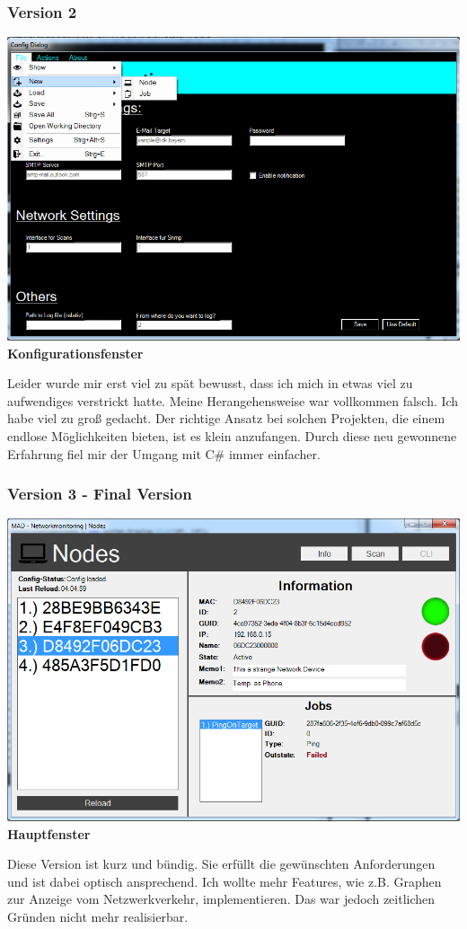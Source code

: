\documentclass[12pt,a4paper]{report}
\begin{document}
\begin{onehalfspace}
\subsubsection{Version 2}
\begin{center}
\includegraphics[scale=0.65]{../docs/lyaton/graphics/GUI_v2_config.png}\\
\textbf{Konfigurationsfenster}
\end{center}
Leider wurde mir erst viel zu spät bewusst, dass ich mich in etwas viel zu aufwendiges verstrickt hatte. Meine Herangehensweise war vollkommen falsch. Ich habe viel zu groß gedacht. Der richtige Ansatz bei solchen Projekten, die einem endlose Möglichkeiten bieten, ist es klein anzufangen. 
Durch diese neu gewonnene Erfahrung fiel mir der Umgang mit C\# immer einfacher.
\subsubsection{Version 3 - Final Version}
\begin{center}
\includegraphics[scale=0.65]{../docs/lyaton/graphics/GUI_v3_demo.png}\\
\textbf{Hauptfenster}
\end{center}
Diese Version ist kurz und bündig. Sie erfüllt die gewünschten Anforderungen und ist dabei optisch ansprechend. Ich wollte mehr Features, wie z.B. Graphen zur Anzeige vom Netzwerkverkehr, implementieren. Das war jedoch zeitlichen Gründen nicht mehr realisierbar.\\


\end{onehalfspace}
\end{document}
